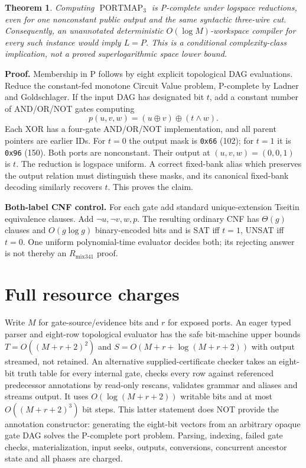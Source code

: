 \documentclass[11pt]{article}
\newtheorem{theorem}{Theorem}
\begin{document}
\begin{theorem}
Computing $\operatorname{PORTMAP}_3$ is P-complete under logspace reductions, even for one nonconstant public output and the same syntactic three-wire cut. Consequently, an unannotated deterministic $O(\log M)$-workspace compiler for every such instance would imply $L=P$. This is a conditional complexity-class implication, not a proved superlogarithmic space lower bound.
\end{theorem}
\noindent\textbf{Proof.} Membership in P follows by eight explicit topological DAG evaluations. Reduce the constant-fed monotone Circuit Value problem, P-complete by Ladner and Goldschlager. If the input DAG has designated bit $t$, add a constant number of AND/OR/NOT gates computing
\[
p(u,v,w)=(u\oplus v)\oplus(t\land w).
\]
Each XOR has a four-gate AND/OR/NOT implementation, and all parent pointers are earlier IDs. For $t=0$ the output mask is \texttt{0x66} (102); for $t=1$ it is \texttt{0x96} (150). Both ports are nonconstant. Their output at $(u,v,w)=(0,0,1)$ is $t$. The reduction is logspace uniform. A correct fixed-bank alias which preserves the output relation must distinguish these masks, and its canonical fixed-bank decoding similarly recovers $t$. This proves the claim.

\noindent\textbf{Both-label CNF control.} For each gate add standard unique-extension Tseitin equivalence clauses. Add $\neg u,\neg v,w,p$. The resulting ordinary CNF has $\Theta(g)$ clauses and $O(g\log g)$ binary-encoded bits and is SAT iff $t=1$, UNSAT iff $t=0$. One uniform polynomial-time evaluator decides both; its rejecting answer is not thereby an $R_{\mathrm{mix341}}$ proof.

\section*{Full resource charges}
Write $M$ for gate-source/evidence bits and $r$ for exposed ports. An eager typed parser and eight-row topological evaluator has the safe bit-machine upper bounds $T=O((M+r+2)^2)$ and $S=O(M+r+\log(M+r+2))$ with output streamed, not retained. An alternative supplied-certificate checker takes an eight-bit truth table for every internal gate, checks every row against referenced predecessor annotations by read-only rescans, validates grammar and aliases and streams output. It uses $O(\log(M+r+2))$ writable bits and at most $O((M+r+2)^3)$ bit steps. This latter statement does NOT provide the annotation constructor: generating the eight-bit vectors from an arbitrary opaque gate DAG solves the P-complete port problem. Parsing, indexing, failed gate checks, materialization, input seeks, outputs, conversions, concurrent ancestor state and all phases are charged.
\end{document}
